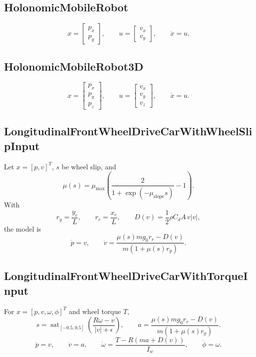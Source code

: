 \documentclass[11pt]{article}
\newcommand{\sat}{\operatorname{sat}}
\begin{document}
\subsection{HolonomicMobileRobot}
\begin{equation}
    x=\begin{bmatrix}p_x\\p_y\end{bmatrix},
    \qquad
    u=\begin{bmatrix}v_x\\v_y\end{bmatrix},
    \qquad
    \dot x=u.
\end{equation}

\subsection{HolonomicMobileRobot3D}
\begin{equation}
    x=\begin{bmatrix}p_x\\p_y\\p_z\end{bmatrix},
    \qquad
    u=\begin{bmatrix}v_x\\v_y\\v_z\end{bmatrix},
    \qquad
    \dot x=u.
\end{equation}

\subsection{LongitudinalFrontWheelDriveCarWithWheelSlipInput}
Let \(x=[p,v]^T\), \(s\) be wheel slip, and
\begin{equation}
    \mu(s) = \mu_{\max}\left(\frac{2}{1+\exp(-\mu_{\mathrm{slope}}s)}-1\right).
\end{equation}
With
\begin{equation}
    r_y=\frac{y_c}{L},\qquad r_r=\frac{x_c}{L},\qquad
    D(v)=\frac{1}{2}\rho C_dA\,v|v|,
\end{equation}
the model is
\begin{equation}
    \dot p=v,
    \qquad
    \dot v =
    \frac{\mu(s)mg_0r_r-D(v)}{m(1+\mu(s)r_y)}.
\end{equation}

\subsection{LongitudinalFrontWheelDriveCarWithTorqueInput}
For \(x=[p,v,\omega,\phi]^T\) and wheel torque \(T\),
\begin{equation}
    s =
    \sat_{[-0.5,0.5]}\left(\frac{R\omega-v}{|v|+\epsilon}\right),
    \qquad
    a = \frac{\mu(s)mg_0r_r-D(v)}{m(1+\mu(s)r_y)}.
\end{equation}
\begin{equation}
    \dot p=v,
    \qquad
    \dot v=a,
    \qquad
    \dot\omega=\frac{T-R(ma+D(v))}{I_w},
    \qquad
    \dot\phi=\omega.
\end{equation}
\end{document}
